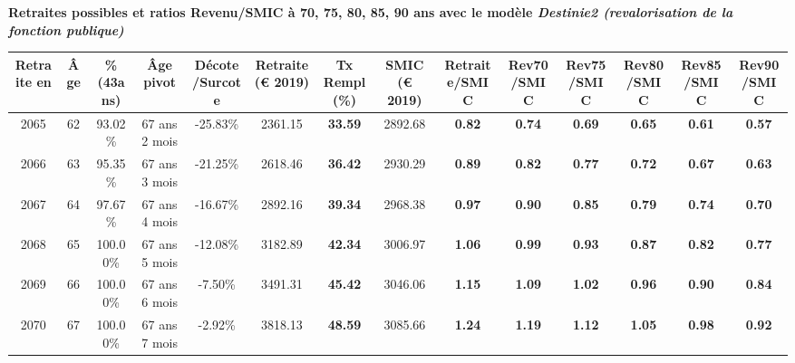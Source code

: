  \vspace{0.1cm} 
{\bf \noindent Retraites possibles et ratios Revenu/SMIC à 70, 75, 80, 85, 90 ans avec le modèle \emph{Destinie2 (revalorisation de la fonction publique)}}  
 
\begin{adjustbox}{max width=\textwidth} 
\begin{tabular}[htb]{|c|c||c|c|c||c|c||c||c|c|c|c|c|c|} 
\hline 
 Retraite en &  Âge &  \%(43ans) &  Âge pivot &  Décote/Surcote &  Retraite (\euro{} 2019) &  Tx Rempl(\%) &  SMIC (\euro{} 2019) &  Retraite/SMIC &  Rev70/SMIC &  Rev75/SMIC &  Rev80/SMIC &  Rev85/SMIC &  Rev90/SMIC \\ 
\hline \hline 
 2065 &  62 &  93.02\% &  67 ans 2 mois &  -25.83\% &  2361.15 &  {\bf 33.59} &  2892.68 &  {\bf {\color{red} 0.82}} &  {\bf {\color{red} 0.74}} &  {\bf {\color{red} 0.69}} &  {\bf {\color{red} 0.65}} &  {\bf {\color{red} 0.61}} &  {\bf {\color{red} 0.57}} \\ 
\hline 
 2066 &  63 &  95.35\% &  67 ans 3 mois &  -21.25\% &  2618.46 &  {\bf 36.42} &  2930.29 &  {\bf {\color{red} 0.89}} &  {\bf {\color{red} 0.82}} &  {\bf {\color{red} 0.77}} &  {\bf {\color{red} 0.72}} &  {\bf {\color{red} 0.67}} &  {\bf {\color{red} 0.63}} \\ 
\hline 
 2067 &  64 &  97.67\% &  67 ans 4 mois &  -16.67\% &  2892.16 &  {\bf 39.34} &  2968.38 &  {\bf {\color{red} 0.97}} &  {\bf {\color{red} 0.90}} &  {\bf {\color{red} 0.85}} &  {\bf {\color{red} 0.79}} &  {\bf {\color{red} 0.74}} &  {\bf {\color{red} 0.70}} \\ 
\hline 
 2068 &  65 &  100.00\% &  67 ans 5 mois &  -12.08\% &  3182.89 &  {\bf 42.34} &  3006.97 &  {\bf 1.06} &  {\bf {\color{red} 0.99}} &  {\bf {\color{red} 0.93}} &  {\bf {\color{red} 0.87}} &  {\bf {\color{red} 0.82}} &  {\bf {\color{red} 0.77}} \\ 
\hline 
 2069 &  66 &  100.00\% &  67 ans 6 mois &  -7.50\% &  3491.31 &  {\bf 45.42} &  3046.06 &  {\bf 1.15} &  {\bf 1.09} &  {\bf 1.02} &  {\bf {\color{red} 0.96}} &  {\bf {\color{red} 0.90}} &  {\bf {\color{red} 0.84}} \\ 
\hline 
 2070 &  67 &  100.00\% &  67 ans 7 mois &  -2.92\% &  3818.13 &  {\bf 48.59} &  3085.66 &  {\bf 1.24} &  {\bf 1.19} &  {\bf 1.12} &  {\bf 1.05} &  {\bf {\color{red} 0.98}} &  {\bf {\color{red} 0.92}} \\ 
\hline 
\hline 
\end{tabular} 
\end{adjustbox} 
 
